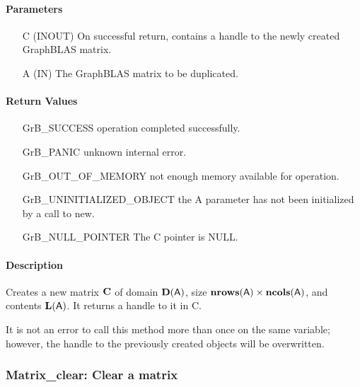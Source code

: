 \paragraph{Parameters}

\begin{itemize}[leftmargin=1.1in]
    \item[{\sf C}] ({\sf INOUT}) On successful return, contains a handle to 
                                 the newly created GraphBLAS matrix.
    \item[{\sf A}] ({\sf IN})    The GraphBLAS matrix to be duplicated.
\end{itemize}


\paragraph{Return Values}

\begin{itemize}[leftmargin=2.1in]
\item[{\sf GrB\_SUCCESS}]   operation completed successfully.
\item[{\sf GrB\_PANIC}]     unknown internal error.
\item[{\sf GrB\_OUT\_OF\_MEMORY}]  not enough memory available for operation.
\item[{\sf GrB\_UNINITIALIZED\_OBJECT}]   the {\sf A} parameter has not been initialized by a
                             call to {\sf new}.
\item[{\sf GrB\_NULL\_POINTER}]   The {\sf C} pointer is {\sf NULL}.
\end{itemize}

\paragraph{Description}

Creates a new matrix ${\bf C}$ of domain $\bold{D}({\sf A})$, size 
$\bold{nrows}({\sf A}) \times \bold{ncols}({\sf A})$, and contents 
$\bold{L}({\sf A})$. It returns a handle to it in {\sf C}.

It is not an error to call this method more than once on the same variable;  
however, the handle to the previously created objects will be overwritten. 

\subsubsection{{\sf Matrix\_clear}: Clear a matrix}

